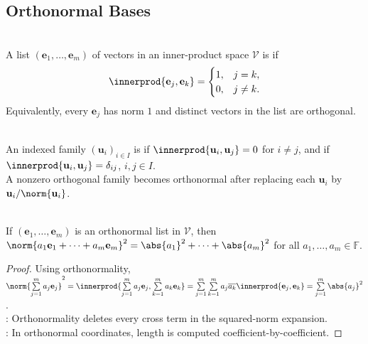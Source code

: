\subsection{Orthonormal Bases}

\begin{definition} \label{def:orthonormal-list} \\
A list $(\mathbf{e}_1,\ldots,\mathbf{e}_m)$ of vectors in an inner-product space $\mathcal{V}$ is  if
\begin{align}
\innerprod{\mathbf{e}_j,\mathbf{e}_k}=
\begin{cases}
1, & j=k,\\
0, & j\neq k.
\end{cases}
\nonumber
\end{align}
Equivalently, every $\mathbf{e}_j$ has norm $1$ and distinct vectors in the list are orthogonal.
\end{definition}

\begin{definition} \label{def:orthogonal-and-orthonormal-sets} \\
An indexed family $(\mathbf{u}_i)_{i\in I}$ is  if $\innerprod{\mathbf{u}_i,\mathbf{u}_j}=0$ for $i\neq j$, and  if $\innerprod{\mathbf{u}_i,\mathbf{u}_j}=\delta_{ij}$, $i,j\in I$.\\
A nonzero orthogonal family becomes orthonormal after replacing each $\mathbf{u}_i$ by $\mathbf{u}_i/\norm{\mathbf{u}_i}$.
\end{definition}

\begin{proposition} \label{prop:orthonormal-linear-combination-norm} \\
If $(\mathbf{e}_1,\ldots,\mathbf{e}_m)$ is an orthonormal list in $\mathcal{V}$, then $\norm{a_1\mathbf{e}_1+\cdots+a_m\mathbf{e}_m}^2=\abs{a_1}^2+\cdots+\abs{a_m}^2$ for all $a_1,\ldots,a_m\in\mathbb{F}$.
\begin{proof}
Using orthonormality, $\norm{\sum\limits_{j=1}^{m}a_j\mathbf{e}_j}^2 =\innerprod{\sum\limits_{j=1}^{m}a_j\mathbf{e}_j,\sum\limits_{k=1}^{m}a_k\mathbf{e}_k} =\sum\limits_{j=1}^{m}\sum\limits_{k=1}^{m}a_j\overline{a_k}\innerprod{\mathbf{e}_j,\mathbf{e}_k} =\sum\limits_{j=1}^{m}\abs{a_j}^2$.\\
: Orthonormality deletes every cross term in the squared-norm expansion.\\
: In orthonormal coordinates, length is computed coefficient-by-coefficient.
\end{proof}
\end{proposition}

